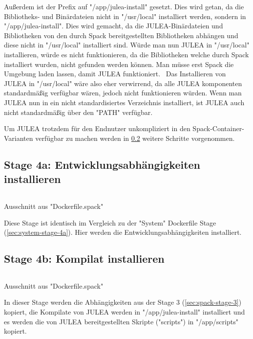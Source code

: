 Außerdem ist der Prefix auf "/app/julea-install" gesetzt. Dies wird getan, da die Bibliotheks- und Binärdateien nicht in "/usr/local" installiert werden, sondern in "/app/julea-install". Dies wird gemacht, da die JULEA-Binärdateien und Bibliotheken von den durch Spack bereitgestellten Bibliotheken abhängen und diese nicht in "/usr/local" installiert sind. Würde man nun JULEA in "/usr/local" installieren, würde es nicht funktionieren, da die Bibliotheken welche durch Spack installiert wurden, nicht gefunden werden können. Man müsse erst Spack die Umgebung laden lassen, damit JULEA funktioniert. \
Das Installieren von JULEA in "/usr/local" wäre also eher verwirrend, da alle JULEA komponenten standardmäßig verfügbar wären, jedoch nicht funktionieren würden. Wenn man JULEA nun in ein nicht standardisiertes Verzeichnis installiert, ist JULEA auch nicht standardmäßig über den "PATH" verfügbar. 

Um JULEA trotzdem für den Endnutzer unkompliziert in den Spack-Container-Varianten verfügbar zu machen werden in \cref{sec:spack-stage-4b} weitere Schritte vorgenommen.

\subsection{Stage 4a: Entwicklungsabhängigkeiten installieren}


\begin{listing}[H]
\inputminted[firstline=51,lastline=55]{dockerfile}{./code-examples/Dockerfile.spack}
\caption{Ausschnitt aus "Dockerfile.spack"}
\end{listing}


Diese Stage ist identisch im Vergleich zu der "System" Dockerfile Stage (\cref{sec:system-stage-4a}). Hier werden die Entwicklungsabhängigkeiten installiert.


\subsection{Stage 4b: Kompilat installieren} \label{sec:spack-stage-4b}

\begin{listing}[H]
\inputminted[firstline=42,lastline=48]{dockerfile}{./code-examples/Dockerfile.spack}
\caption{Ausschnitt aus "Dockerfile.spack"}
\end{listing}


In dieser Stage werden die Abhängigkeiten aus der Stage 3 (\cref{sec:spack-stage-3}) kopiert, die Kompilate von JULEA werden in "/app/julea-install" installiert und es werden die von JULEA bereitgestellten Skripte ("scripts") in "/app/scripts" kopiert.

